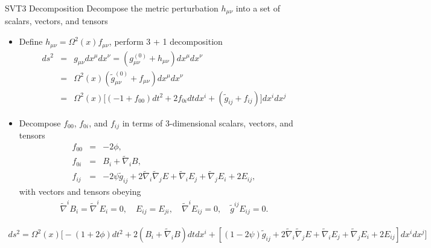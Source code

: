 \documentclass[8pt,aspectratio=1610]{beamer}
\begin{document}
\begin{frame}{SVT3 Decomposition}
	Decompose the metric perturbation $h_{\mu\nu}$ into a set of scalars, vectors, and tensors
	\begin{itemize}
		\item Define $h_{\mu\nu} = \Omega^2(x)f_{\mu\nu}$, perform 3 + 1 decomposition
		\begin{eqnarray}
			ds^2 &=& g_{\mu\nu}dx^\mu dx^\nu = (g_{\mu\nu}^{(0)} + h_{\mu\nu})dx^\mu dx^\nu
			\nonumber\\
			&=& \Omega^2(x)(\tilde g_{\mu\nu}^{(0)} + f_{\mu\nu})dx^\mu dx^\nu
			\nonumber\\
			&=& \Omega^2(x)\big[(-1+f_{00})dt^2 + 2f_{0i}dtdx^i + (\tilde g_{ij} + f_{ij})\big]dx^i dx^j
		\end{eqnarray}
		\item Decompose $f_{00}$, $f_{0i}$, and $f_{ij}$ in terms of 3-dimensional scalars, vectors, and tensors
		\begin{eqnarray}
			f_{00} &=& -2\phi,
			\nonumber\\
			f_{0i} &=& B_i + \tilde\nabla_i B,
			\nonumber\\
			f_{ij} &=& -2\psi \tilde g_{ij} + 2\tilde\nabla_i \tilde\nabla_j E + \tilde\nabla_i E_j + \tilde\nabla_j E_i + 2E_{ij},
		\end{eqnarray}
		with vectors and tensors obeying
		\begin{eqnarray}
			\tilde\nabla^i B_i = \tilde\nabla^i E_i = 0,\quad E_{ij} = E_{ji},\quad\tilde\nabla^i E_{ij} = 0,\quad \tilde g^{ij}E_{ij} = 0.
		\end{eqnarray}
	\end{itemize}
	\begin{eqnarray}
		ds^2 = \Omega^2(x)\bigg[-(1+2\phi)dt^2 + 2(B_i + \tilde\nabla_i B)dt dx^i 
		+ [(1-2\psi)\tilde g_{ij} + 2\tilde\nabla_i \tilde\nabla_j E + \tilde\nabla_i E_j + \tilde\nabla_j E_i + 2E_{ij}]dx^i dx^j\bigg]
	\end{eqnarray}
\end{frame}

\end{document}
